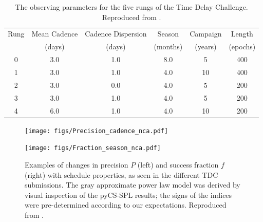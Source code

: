 \begin{table}
\begin{center}
\capstart
\begin{tabular}{cccccc} \hline\hline
  Rung &  Mean Cadence & Cadence Dispersion & Season   & Campaign & Length   \\
       &  (days)       & (days)             & (months) & (years)  & (epochs) \\ \hline
  0    &    3.0        &   1.0              &   8.0    &    5     & 400      \\
  1    &    3.0        &   1.0              &   4.0    &    10    & 400      \\
  2    &    3.0        &   0.0              &   4.0    &    5     & 200      \\
  3    &    3.0        &   1.0              &   4.0    &    5     & 200      \\
  4    &    6.0        &   1.0              &   4.0    &    10    & 200      \\
\hline\hline
\end{tabular}
\end{center}
\caption{The observing parameters for the five rungs of the Time Delay
Challenge. Reproduced from \citet{LiaoEtal2015}.\label{tab:tdcrungs}}
\end{table}

\begin{figure}[!ht]
  \capstart
  \begin{minipage}[b]{\linewidth}
    \begin{minipage}[b]{0.48\linewidth}
      \centering\texttt{[image: figs/Precision\_cadence\_nca.pdf]}
    \end{minipage} \hfill
    \begin{minipage}[b]{0.48\linewidth}
      \centering\texttt{[image: figs/Fraction\_season\_nca.pdf]}
    \end{minipage}
  \end{minipage}
\caption{Examples of changes in precision $P$
(left) and success fraction $f$ (right) with schedule properties, as
seen in the different TDC submissions. The gray approximate power law
model was derived by visual inspection of the pyCS-SPL results; the
signs of the indices were pre-determined according to our expectations.
Reproduced from \citet{LiaoEtal2015}.}
\label{fig:tdcresults}
\end{figure}

